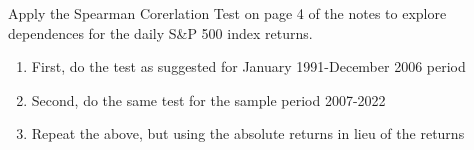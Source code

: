 Apply the Spearman Corerlation Test on page 4 of the notes to explore dependences for the daily S\&P 500 index returns.

\begin{enumerate}[label = \alph*)]
    \item First, do the test as suggested for January 1991-December 2006 period
    \item Second, do the same test for the sample period 2007-2022
    \item Repeat the above, but using the absolute returns in lieu of the returns 
\end{enumerate}